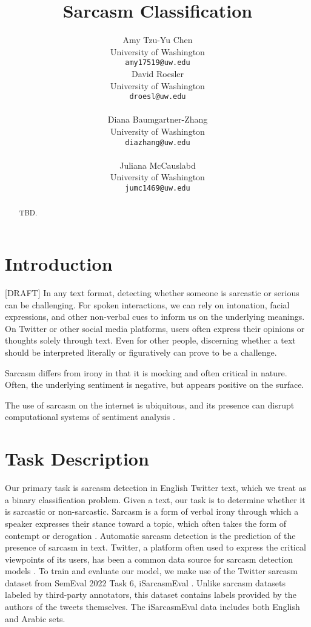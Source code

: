 \documentclass[11pt]{article}
\title{Sarcasm Classification}
\author{Amy Tzu-Yu Chen \\
  University of Washington \\
  \texttt{amy17519@uw.edu} \\\And
  {David Roesler \\
  University of Washington \\
  \texttt{droesl@uw.edu} \\} \\\AND
  {Diana Baumgartner-Zhang \\
  University of Washington \\
  \texttt{diazhang@uw.edu} \\} \\\And
  Juliana McCauslabd \\
  University of Washington \\
  \texttt{jumc1469@uw.edu} \\}
\begin{document}
\maketitle

\begin{abstract}

TBD.

\end{abstract}

\section{Introduction}

[DRAFT]
In any text format, detecting whether someone is sarcastic or serious can be challenging. For spoken interactions, we can rely on intonation, facial expressions, and other non-verbal cues to inform us on the underlying meanings. On Twitter or other social media platforms, users often express their opinions or thoughts solely through text. Even for other people, discerning whether a text should be interpreted literally or figuratively can prove to be a challenge.

Sarcasm differs from irony in that it is mocking and often critical in nature. Often, the underlying sentiment is negative, but appears positive on the surface.

The use of sarcasm on the internet is ubiquitous, and its presence can disrupt computational systems of sentiment analysis \citealp{Liu2010SentimentAA}.

\section{Task Description}

Our primary task is sarcasm detection in English Twitter text, which we treat as a binary classification problem. Given a text, our task is to determine whether it is sarcastic or non-sarcastic. Sarcasm is a form of verbal irony through which a speaker expresses their stance toward a topic, which often takes the form of contempt or derogation \citealp{WILSON20061722}. Automatic sarcasm detection \citealp{joshi:automatic} is the prediction of the presence of sarcasm in text. 
Twitter, a platform often used to express the critical viewpoints of its users, has been a common data source for sarcasm detection models \citealp{doi:10.1177/1470785320921779}. To train and evaluate our model, we make use of the Twitter sarcasm dataset from SemEval 2022 Task 6, iSarcasmEval \citealp{oprea-magdy-2020-isarcasm}. Unlike sarcasm datasets labeled by third-party annotators, this dataset contains labels provided by the authors of the tweets themselves. The iSarcasmEval data includes both English and Arabic sets. 
\end{document}
